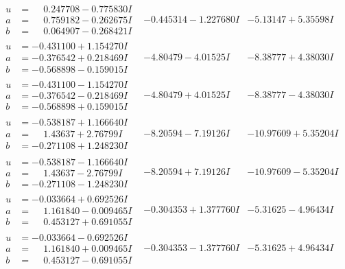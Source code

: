 \documentclass[1p]{elsarticle_modified}
\theoremstyle{definition}
\begin{document}
$$\begin{array}{c|c|c}
\begin{aligned}
u &= \phantom{-}0.247708 - 0.775830 I \\
a &= \phantom{-}0.759182 - 0.262675 I \\
b &= \phantom{-}0.064907 - 0.268421 I\end{aligned}
 & -0.445314 - 1.227680 I & -5.13147 + 5.35598 I \\ \hline\begin{aligned}
u &= -0.431100 + 1.154270 I \\
a &= -0.376542 + 0.218469 I \\
b &= -0.568898 - 0.159015 I\end{aligned}
 & -4.80479 - 4.01525 I & -8.38777 + 4.38030 I \\ \hline\begin{aligned}
u &= -0.431100 - 1.154270 I \\
a &= -0.376542 - 0.218469 I \\
b &= -0.568898 + 0.159015 I\end{aligned}
 & -4.80479 + 4.01525 I & -8.38777 - 4.38030 I \\ \hline\begin{aligned}
u &= -0.538187 + 1.166640 I \\
a &= \phantom{-}1.43637 + 2.76799 I \\
b &= -0.271108 + 1.248230 I\end{aligned}
 & -8.20594 - 7.19126 I & -10.97609 + 5.35204 I \\ \hline\begin{aligned}
u &= -0.538187 - 1.166640 I \\
a &= \phantom{-}1.43637 - 2.76799 I \\
b &= -0.271108 - 1.248230 I\end{aligned}
 & -8.20594 + 7.19126 I & -10.97609 - 5.35204 I \\ \hline\begin{aligned}
u &= -0.033664 + 0.692526 I \\
a &= \phantom{-}1.161840 - 0.009465 I \\
b &= \phantom{-}0.453127 + 0.691055 I\end{aligned}
 & -0.304353 + 1.377760 I & -5.31625 - 4.96434 I \\ \hline\begin{aligned}
u &= -0.033664 - 0.692526 I \\
a &= \phantom{-}1.161840 + 0.009465 I \\
b &= \phantom{-}0.453127 - 0.691055 I\end{aligned}
 & -0.304353 - 1.377760 I & -5.31625 + 4.96434 I \\ \hline\begin{aligned}

\end{aligned}
\end{array}$$
\end{document}
